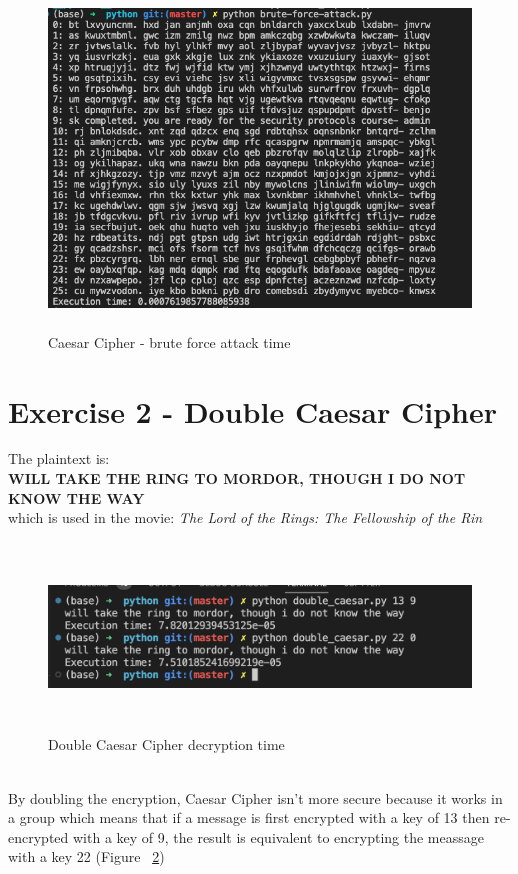 \documentclass{article}
\begin{document}
\begin{figure}[htp]
    \centering
    \includegraphics[width=120mm, height=90mm]{brute_force_single_caesar.png}
    \caption{Caesar Cipher - brute force attack time}
    \label{fig:bf_attack_time}
\end{figure}

\section*{Exercise 2 - Double Caesar Cipher}

The plaintext is:\\
\textbf{WILL TAKE THE RING TO MORDOR, THOUGH I DO NOT KNOW THE WAY}\\
which is used in the movie:
\emph{The Lord of the Rings: The Fellowship of the Rin}

\begin{figure}[htp]
    \centering
    \includegraphics[width=120mm, height=50mm]{double_caesar.png}
    \caption{Double Caesar Cipher decryption time}
    \label{fig:double_caesar_decrypt_time}
\end{figure}

\\
By doubling the encryption, Caesar Cipher isn't more secure because
it works in a group which means that if a message is first encrypted
with a key of 13 then re-encrypted with a key of 9, the result is
equivalent to encrypting the meassage with a key 22 (Figure
~\ref{fig:double_caesar_decrypt_time})
\end{document}
